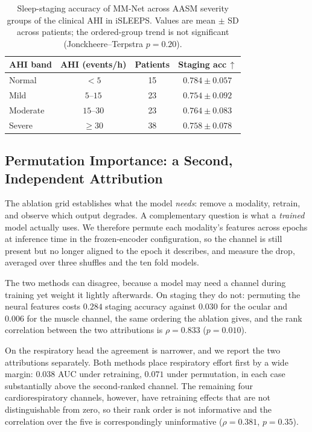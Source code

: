\documentclass[a4paper,fleqn]{cas-sc}
\begin{document}
\begin{table}[H]
\caption{Sleep-staging accuracy of MM-Net across AASM severity groups of the clinical AHI in
iSLEEPS. Values are mean $\pm$ SD across patients; the ordered-group trend is not significant
(Jonckheere--Terpstra $p=0.20$).}
\label{tab:severity}
\centering
\small
\begin{tabular}{lccc}
\toprule
AHI band & AHI (events/h) & Patients & Staging acc\,$\uparrow$ \\
\midrule
Normal   & $<5$       & 15 & $0.784 \pm 0.057$ \\
Mild     & $5$--$15$  & 23 & $0.754 \pm 0.092$ \\
Moderate & $15$--$30$ & 23 & $0.764 \pm 0.083$ \\
Severe   & $\geq 30$  & 38 & $0.758 \pm 0.078$ \\
\bottomrule
\end{tabular}
\end{table}

\subsection{Permutation Importance: a Second, Independent Attribution}
The ablation grid establishes what the model \emph{needs}: remove a modality, retrain, and observe which output degrades. A complementary question is what a \emph{trained} model actually
uses. We therefore permute each modality's features across epochs at inference time in the
frozen-encoder configuration, so the
channel is still present but no longer aligned to the epoch it describes, and measure the
drop, averaged over three shuffles and the ten fold models.

The two methods can disagree, because a model may need a channel during training yet weight it
lightly afterwards. On staging they do not: permuting the neural features costs $0.284$ staging
accuracy against $0.030$ for the ocular and $0.006$ for the muscle channel, the same ordering
the ablation gives, and the rank correlation between the two attributions is $\rho=0.833$
($p=0.010$).

On the respiratory head the agreement is narrower, and we report the two attributions
separately. Both methods place respiratory effort first by a wide margin: $0.038$ AUC under retraining, $0.071$ under permutation, in each case substantially above the second-ranked channel. The remaining four cardiorespiratory channels, however, have retraining effects that are not distinguishable from zero, so their rank order is not informative and the correlation over the five is correspondingly uninformative ($\rho=0.381$, $p=0.35$).
\end{document}
